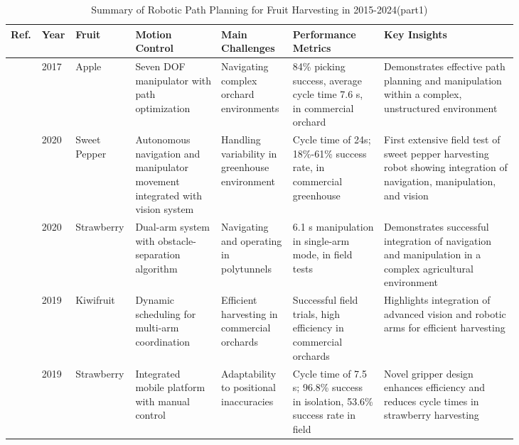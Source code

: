\documentclass[a4paper,fleqn]{cas-dc}
\begin{document}
\iffalse
\begin{table}   
	\centering
	\footnotesize 
	\caption{Summary of Robotic Path Planning for Fruit Harvesting in 2015-2024(part1)} 
	\label{tab:path-planning-based}
	\begin{tabular}{p{0.025\linewidth} p{0.025\linewidth} p{0.055\linewidth} p{0.16\linewidth} p{0.135\linewidth} p{0.175\linewidth} p{0.255\linewidth}}
\toprule
\textbf{Ref.} & \textbf{Year} & \textbf{Fruit} & \textbf{Motion Control} & \textbf{Main Challenges} & \textbf{Performance Metrics} & \textbf{Key Insights} \\ \midrule

\cite{silwal2017design} & 2017 & Apple & Seven DOF manipulator with path optimization & Navigating complex orchard environments & 84\% picking success, average cycle time 7.6 s, in commercial orchard & Demonstrates effective path planning and manipulation within a complex, unstructured environment \\ \midrule
\cite{arad2020development} & 2020 & Sweet Pepper & Autonomous navigation and manipulator movement integrated with vision system & Handling variability in greenhouse environment & Cycle time of 24s; 18\%-61\% success rate, in commercial greenhouse & First extensive field test of sweet pepper harvesting robot showing integration of navigation, manipulation, and vision \\ \midrule
\cite{xiong2020autonomous} & 2020 & Strawberry & Dual-arm system with obstacle-separation algorithm & Navigating and operating in polytunnels & 6.1 s manipulation in single-arm mode, in field tests & Demonstrates successful integration of navigation and manipulation in a complex agricultural environment \\ \midrule
\cite{williams2019robotic} & 2019 & Kiwifruit & Dynamic scheduling for multi-arm coordination & Efficient harvesting in commercial orchards & Successful field trials, high efficiency in commercial orchards & Highlights integration of advanced vision and robotic arms for efficient harvesting \\ \midrule
\cite{xiong2019development} & 2019 & Strawberry & Integrated mobile platform with manual control & Adaptability to positional inaccuracies & Cycle time of 7.5 s; 96.8\% success in isolation, 53.6\% success rate in field& Novel gripper design enhances efficiency and reduces cycle times in strawberry harvesting \\ \midrule

\end{tabular}
\end{table}
\end{document}
